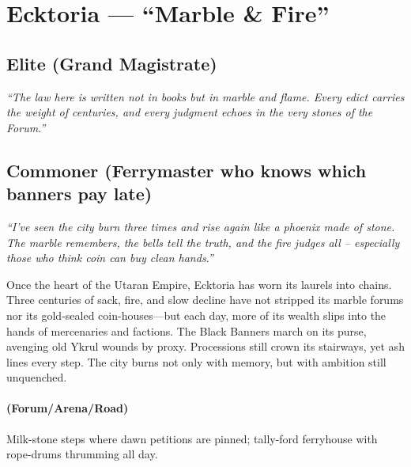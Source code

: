 \section{Ecktoria --- ``Marble \& Fire''}
\label{chap:ecktoria}

\subsection*{Elite (Grand Magistrate)}
\textit{``The law here is written not in books but in marble and flame. Every edict carries the weight of centuries, and every judgment echoes in the very stones of the Forum.''}

\subsection*{Commoner (Ferrymaster who knows which banners pay late)}
\textit{``I've seen the city burn three times and rise again like a phoenix made of stone. The marble remembers, the bells tell the truth, and the fire judges all – especially those who think coin can buy clean hands.''}

\begin{tcolorbox}[colback=black!3,colframe=black!40!white,title={Theme \& Atmosphere}]
Once the heart of the Utaran Empire, Ecktoria has worn its laurels into chains. Three centuries of sack, fire, and slow decline have not stripped its marble forums nor its gold-sealed coin-houses---but each day, more of its wealth slips into the hands of mercenaries and factions. The Black Banners march on its purse, avenging old Ykrul wounds by proxy. Processions still crown its stairways, yet ash lines every step. The city burns not only with memory, but with ambition still unquenched.
\end{tcolorbox}

\paragraph*{(Forum/Arena/Road)} Milk-stone steps where dawn petitions are pinned; tally-ford ferryhouse with rope-drums thrumming all day.

